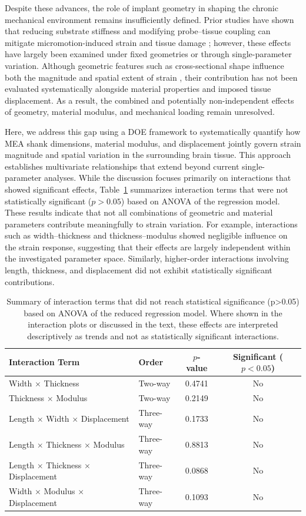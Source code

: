 \documentclass[fleqn,10pt]{wlscirep}
\begin{document}
Despite these advances, the role of implant geometry in shaping the chronic mechanical environment remains insufficiently defined. Prior studies have shown that reducing substrate stiffness and modifying probe--tissue coupling can mitigate micromotion-induced strain and tissue damage \cite{Subbaroyan2005, AlAbed2022, Sridharan2015, Seymour2007, Polanco2014, Muthuswamy2003}; however, these effects have largely been examined under fixed geometries or through single-parameter variation. Although geometric features such as cross-sectional shape influence both the magnitude and spatial extent of strain \cite{Kim2021}, their contribution has not been evaluated systematically alongside material properties and imposed tissue displacement. As a result, the combined and potentially non-independent effects of geometry, material modulus, and mechanical loading remain unresolved.

Here, we address this gap using a DOE framework to systematically quantify how MEA shank dimensions, material modulus, and displacement jointly govern strain magnitude and spatial variation in the surrounding brain tissue. This approach establishes multivariate relationships that extend beyond current single-parameter analyses. While the discussion focuses primarily on interactions that showed significant effects, Table~\ref{Table 2} summarizes interaction terms that were not statistically significant ($p > 0.05$) based on ANOVA of the regression model. These results indicate that not all combinations of geometric and material parameters contribute meaningfully to strain variation. For example, interactions such as width--thickness and thickness--modulus showed negligible influence on the strain response, suggesting that their effects are largely independent within the investigated parameter space. Similarly, higher-order interactions involving length, thickness, and displacement did not exhibit statistically significant contributions.
\begin{table}[t]
\centering
\caption{Summary of interaction terms that did not reach statistical significance (p>0.05) based on ANOVA of the reduced regression model. Where shown in the interaction plots or discussed in the text, these effects are interpreted descriptively as trends and not as statistically significant interactions.}
\label{Table 2}
\begin{tabular}{l l c c}
\hline
\textbf{Interaction Term} & \textbf{Order} & \textbf{$p$-value} & \textbf{Significant ($p<0.05$)} \\
\hline
Width $\times$ Thickness & Two-way & 0.4741 & No \\
Thickness $\times$ Modulus & Two-way & 0.2149 & No \\
Length $\times$ Width $\times$ Displacement & Three-way & 0.1733 & No \\
Length $\times$ Thickness $\times$ Modulus & Three-way & 0.8813 & No \\
Length $\times$ Thickness $\times$ Displacement & Three-way & 0.0868 & No \\
Width $\times$ Modulus $\times$ Displacement & Three-way & 0.1093 & No \\
\hline
\end{tabular}
\end{table}
\end{document}
